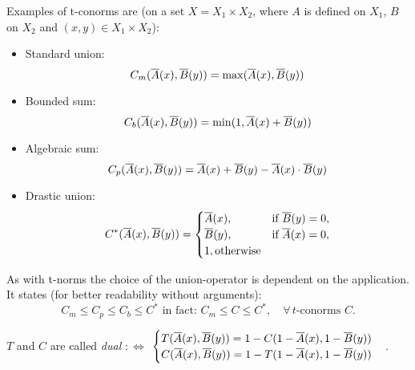 Examples of t-conorms are (on a set $X=X_1\times X_2$, where $A$ is defined on $X_1$, $B$ on $X_2$ and  $(x,y)\in X_1\times X_2$):
\begin{itemize}
\item Standard union:
	\[ C_m(\overline{A}(x),\overline{B}(y)) = \max(\overline{A}(x),\overline{B}(y)) \]
\item Bounded sum:
	\[ C_b(\overline{A}(x),\overline{B}(y)) = \min(1, \overline{A}(x)+\overline{B}(y)) \]
\item Algebraic sum:
	\[ C_p(\overline{A}(x),\overline{B}(y)) = \overline{A}(x)+\overline{B}(y) - \overline{A}(x)\cdot\overline{B}(y) \]
\item Drastic union:
	\[ C^*(\overline{A}(x),\overline{B}(y)) = \begin{cases}
	\overline{A}(x), &\text{if } \overline{B}(y)=0,\\
	\overline{B}(y), &\text{if } \overline{A}(x)=0,\\
	1, \text{otherwise}
	\end{cases} \]
\end{itemize}
As with t-norms the choice of the union-operator is dependent on the application.\\
It states (for better readability without arguments):
\[ C_m \leq C_p \leq C_b \leq C^* \text{ in fact: } C_m \leq C \leq C^*,\quad\forall\, t\text{-conorms } C. \]

$T$ and $C$ are called \emph{dual} $:\Leftrightarrow$ $\begin{cases}
T(\overline{A}(x),\overline{B}(y)) = 1 - C(1-\overline{A}(x), 1-\overline{B}(y)) \\
C(\overline{A}(x),\overline{B}(y)) = 1 - T(1-\overline{A}(x), 1-\overline{B}(y))
\end{cases}$.


